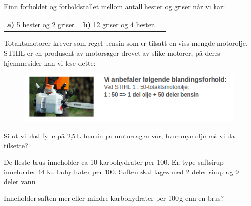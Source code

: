  \vs
{}

Finn forholdet og forholdstallet mellom antall hester og griser når vi har:\os
\begin{tabular}{@{}l l l}	
	\textbf{a)} 5 hester og 2 griser. &\textbf{b)} 12 griser og 4 hester.
\end{tabular}

\newpage
{}
Totaktsmotorer krever som regel bensin som er tilsatt en viss mengde motorolje. STHIL er en produsent av motorsager drevet av slike motorer, på deres hjemmesider kan vi lese dette:
\begin{figure}
	\includegraphics[]{stihl}
\end{figure}
Si at vi skal fylle på 2,5\,L bensin på motorsagen vår, hvor mye olje må vi da tilsette?

\vsk \vspace{12pt}

De fleste brus inneholder ca 10 karbohydrater per 100. En type saftsirup inneholder 44 karbohydrater per 100. Saften skal lages med 2 deler sirup og 9 deler vann. \os

Inneholder saften mer eller mindre karbohydrater per 100\,g enn en brus? \os




